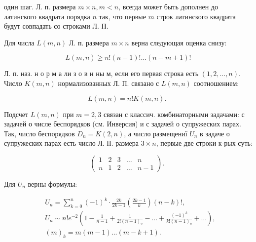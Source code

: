 \documentclass[10pt]{article}
\begin{document}
один шаг. Л. п. размера $m \times n, m<n$, всегда может быть дополнен до латинского квадрата порядка $n$ так, что первые $m$ строк латинского квадрата будут совпадать со строками Л. П.



Для числа $L(m, n)$ Л. п. размера $m \times n$ верна следующая оценка снизу:



\[

L(m, n) \geqslant n !(n-1) ! \ldots(n-m+1) !

\]



Л. п. наз. н о р м а ли з о в н ны м, если его первая строка есть $(1,2, \ldots, n)$. Число $K(m, n)$ нормализованных Л. П. связано с $L(m, n)$ соотношением:



\[

L(m, n)=n ! K(m, n) \text {. }

\]



Подсчет $L(m, n)$ при $m=2,3$ связан с классич. комбинаторными задачами: с задачей о числе беспорядков (см. Инверсия) и с задачей о супружеских парах. Так, число беспорядков $D_{n}=K(2, n)$, а число размещениї $U_{n}$ в задаче о супружеских парах есть число Л. ІІ. размера $3 \times n$, первые две строки к-рых суть:



\[

\left(\begin{array}{lllll}

1 & 2 & 3 & \ldots & n \\

n & 1 & 2 & \ldots & n-1

\end{array}\right) \text {. }

\]



Для $U_{n}$ верны формулы:



\[

\begin{aligned}

& U_{n}=\sum_{k=0}^{n}(-1)^{k} \cdot \frac{2 k}{2 k-1}\left(\frac{2 k-1}{k}\right)(n-k) !, \\

& U_{n} \sim n ! e^{-2}\left(1-\frac{1}{n-1}+\frac{1}{2 !(n-1)_{2}}-\ldots+\frac{(-1)^{k}}{k !(n-1)_{k}}+\ldots\right) \text {, } \\

& (m)_{k}=m(m-1) \ldots(m-k+1) \text {. }

\end{aligned}

\]
\end{document}
